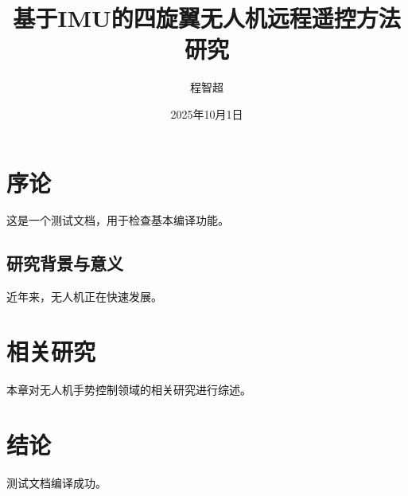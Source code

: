 \documentclass[12pt]{ctexart}
\begin{document}

\title{基于IMU的四旋翼无人机远程遥控方法研究}
\author{程智超}
\date{2025年10月1日}
\maketitle

\tableofcontents

\newpage

\section{序论}

这是一个测试文档，用于检查基本编译功能。

\subsection{研究背景与意义}

近年来，无人机正在快速发展\cite{tezza2019state}。

\section{相关研究}

本章对无人机手势控制领域的相关研究进行综述。

\section{结论}

测试文档编译成功。

\printbibliography
\end{document}
